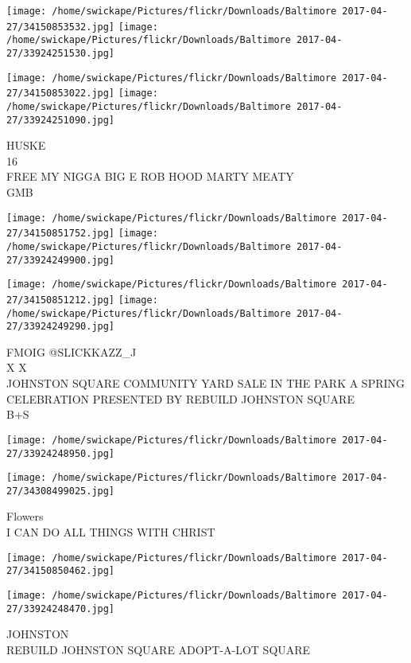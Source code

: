 \documentclass[10pt,letterpaper]{article}
\begin{document}
\texttt{[image: /home/swickape/Pictures/flickr/Downloads/Baltimore 2017-04-27/34150853532.jpg]}
\texttt{[image: /home/swickape/Pictures/flickr/Downloads/Baltimore 2017-04-27/33924251530.jpg]}

\texttt{[image: /home/swickape/Pictures/flickr/Downloads/Baltimore 2017-04-27/34150853022.jpg]}
\texttt{[image: /home/swickape/Pictures/flickr/Downloads/Baltimore 2017-04-27/33924251090.jpg]}

HUSKE\\
16\\
FREE MY NIGGA BIG E ROB HOOD MARTY MEATY\\
GMB
\pagebreak

\texttt{[image: /home/swickape/Pictures/flickr/Downloads/Baltimore 2017-04-27/34150851752.jpg]}
\texttt{[image: /home/swickape/Pictures/flickr/Downloads/Baltimore 2017-04-27/33924249900.jpg]}

\texttt{[image: /home/swickape/Pictures/flickr/Downloads/Baltimore 2017-04-27/34150851212.jpg]}
\texttt{[image: /home/swickape/Pictures/flickr/Downloads/Baltimore 2017-04-27/33924249290.jpg]}

FMOIG @SLICKKAZZ\_J\\
X X\\
JOHNSTON SQUARE COMMUNITY YARD SALE IN THE PARK A SPRING CELEBRATION PRESENTED BY REBUILD JOHNSTON SQUARE\\
B+S
\pagebreak

\texttt{[image: /home/swickape/Pictures/flickr/Downloads/Baltimore 2017-04-27/33924248950.jpg]}

\vspace{0.25in}
\texttt{[image: /home/swickape/Pictures/flickr/Downloads/Baltimore 2017-04-27/34308499025.jpg]}

Flowers\\
I CAN DO ALL THINGS WITH CHRIST
\pagebreak

\texttt{[image: /home/swickape/Pictures/flickr/Downloads/Baltimore 2017-04-27/34150850462.jpg]}

\vspace{0.25in}
\texttt{[image: /home/swickape/Pictures/flickr/Downloads/Baltimore 2017-04-27/33924248470.jpg]}

JOHNSTON\\
REBUILD JOHNSTON SQUARE ADOPT{-}A{-}LOT SQUARE
\pagebreak
\end{document}
